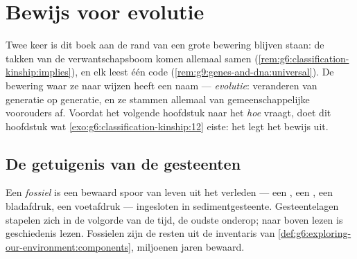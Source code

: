 \chapter{Bewijs voor evolutie}\label{ch:g9:evidence-of-evolution}

Twee keer is dit boek aan de rand van een grote bewering blijven
staan: de takken van de verwantschapsboom komen allemaal samen
(\cref{rem:g6:classification-kinship:implies}), en elk  leest één code
(\cref{rem:g9:genes-and-dna:universal}). De bewering waar ze naar
wijzen heeft een naam --- \emph{evolutie}:  veranderen van
generatie op generatie, en ze stammen allemaal van
gemeenschappelijke voorouders af. Voordat het volgende hoofdstuk
naar het \emph{hoe} vraagt, doet dit hoofdstuk wat
\cref{exo:g6:classification-kinship:12} eiste: het legt het bewijs
uit.

\section{De getuigenis van de gesteenten}

\begin{definition}[Fossielen]\label{def:g9:evidence-of-evolution:fossils}
Een \emph{fossiel} is een bewaard spoor van leven
uit het verleden --- een , een , een bladafdruk, een
voetafdruk --- ingesloten in sedimentgesteente. Gesteentelagen
stapelen zich in de volgorde van de tijd, de oudste onderop; naar
boven lezen is geschiedenis lezen. Fossielen zijn de resten uit de
inventaris van
\cref{def:g6:exploring-our-environment:components}, miljoenen
jaren bewaard.
\end{definition}

